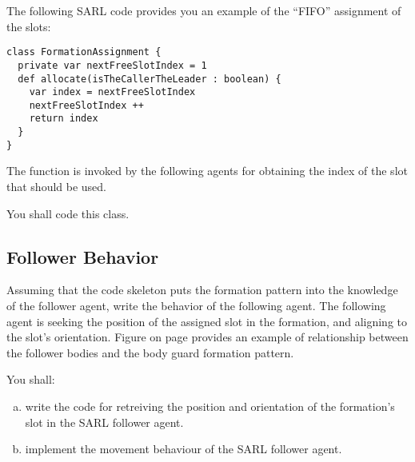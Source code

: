 \documentclass[article,english,nodocumentinfo]{multiagentfrreport}
\begin{document}
The following SARL code provides you an example of the ``FIFO'' assignment of the slots:
\begin{lstlisting}
class FormationAssignment {
  private var nextFreeSlotIndex = 1
  def allocate(isTheCallerTheLeader : boolean) {
    var index = nextFreeSlotIndex
    nextFreeSlotIndex ++
    return index
  }
}
\end{lstlisting}

The function  is invoked by the following agents for obtaining the index of the slot that should be used.

You shall code this class.

\subsection{Follower Behavior}

Assuming that the code skeleton puts the formation pattern into the knowledge of the follower agent, write the behavior of the following agent.
The following agent is seeking the position of the assigned slot in the formation, and aligning to the slot's orientation.
Figure  on page  provides an example of relationship between the follower bodies and the body guard formation pattern.

You shall:
\begin{enumerate}[a)]
\item write the code for retreiving the position and orientation of the formation's slot in the SARL follower agent.
\item implement the movement behaviour of the SARL follower agent.
\end{enumerate}
\end{document}
